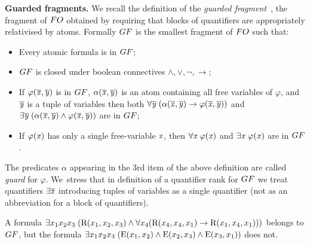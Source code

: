 \noindent \textbf{Guarded fragments.}
We recall the definition of the \emph{guarded fragment}~\cite[Sec. 4.1]{AndrekaNB98}, \ie the fragment of $\FO$ obtained by requiring that blocks of quantifiers are appropriately relativised by atoms.
Formally $\GF$ is the smallest fragment of $\FO$  such that:
\begin{itemize}\itemsep0em
    \item Every atomic formula is in $\GF$;
    \item $\GF$ is closed under boolean connectives $\land, \lor, \neg, \to$;
    \item If $\varphi(\overline{\mathit{x}}, \overline{\mathit{y}})$ is in $\GF$, $\alpha(\overline{\mathit{x}}, \overline{\mathit{y}})$ is an atom containing all free variables of $\varphi$, and $\overline{\mathit{y}}$ is a tuple of variables then both $\forall{\overline{\mathit{y}}} \; (\alpha(\overline{\mathit{x}}, \overline{\mathit{y}}) \to \varphi(\overline{\mathit{x}}, \overline{\mathit{y}}))$ and $\exists{\overline{\mathit{y}}} \; (\alpha(\overline{\mathit{x}}, \overline{\mathit{y}}) \land \varphi(\overline{\mathit{x}}, \overline{\mathit{y}}))$ are in $\GF$; 
    \item If $\varphi(\mathit{x})$ has only a single free-variable $\mathit{x}$, then $\forall{\mathit{x}}\; \varphi(\mathit{x})$ and $\exists{\mathit{x}}\; \varphi(\mathit{x})$ are in $\GF$.
\end{itemize}
The predicates $\alpha$ appearing in the 3rd item of the above definition are called \emph{guard} for $\varphi$.
We~stress that in definition of a quantifier rank for $\GF$ we treat quantifiers $\exists{\overline{\mathit{x}}}$ introducing tuples of variables as a single quantifier (not as an abbreviation for a block of quantifiers).

\begin{example}
A formula $\exists{x_{1}x_{2}x_{3}}\; (\mathrm{R}(x_{1}, x_{2}, x_{3}) \land \forall x_{4}(\mathrm{R}(x_{4}, x_{4}, x_{1}) \to \mathrm{R}(x_{1}, x_{4}, x_{1})))$ belongs to $\GF$, but the formula $\exists{x_{1}x_{2}x_{3}}\; (\mathrm{E}(x_{1}, x_{2}) \land \mathrm{E}(x_{2}, x_{3}) \land \mathrm{E}(x_{3}, x_{1}))$ does not.
\end{example}

